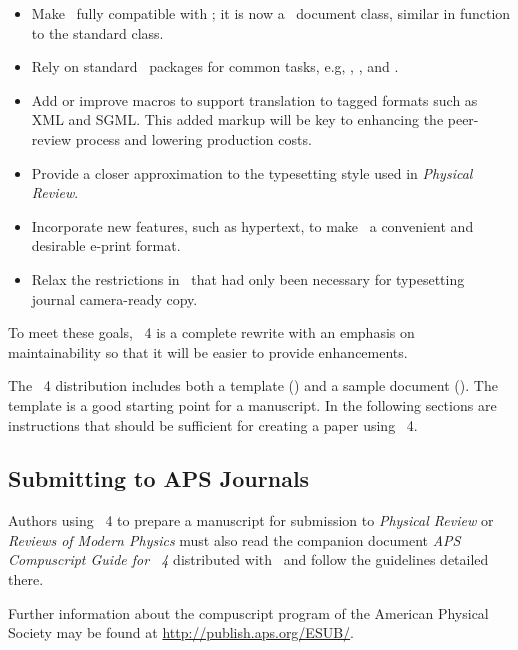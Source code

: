 \documentclass[%
 ,twocolumn%
 ,secnumarabic%
,amssymb, amsmath,nobibnotes, aps, prl]{revtex4}
\begin{document}
\begin{itemize}
\item
Make \revtex\ fully compatible with \LaTeXe; it is now a \LaTeXe\
document class, similar in function to the standard
 class.

\item
Rely on standard \LaTeXe\ packages for common tasks, e.g,
,
, and
.

\item
Add or improve macros to support translation to tagged formats such as
XML and SGML. This added markup will be key to enhancing the
peer-review process and lowering production costs.

\item
Provide a closer approximation to the typesetting style used in
\emph{Physical Review}.

\item
Incorporate new features, such as hypertext, to make \revtex\ a
convenient and desirable e-print format.

\item
Relax the restrictions in \revtex\ that had only been necessary for
typesetting journal camera-ready copy.
\end{itemize}

To meet these goals, \revtex~4 is a complete rewrite with an emphasis
on maintainability so that it will be easier to provide enhancements.

The \revtex~4 distribution includes both a template
() and a sample document ().
The template is a good starting point for a manuscript. In the
following sections are instructions that should be sufficient for
creating a paper using \revtex~4.

\subsection{Submitting to APS Journals}

Authors using \revtex~4 to prepare a manuscript for submission to
\textit{Physical Review} or \textit{Reviews of Modern Physics} 
must also read the companion document \textit{APS Compuscript Guide
for \revtex~4}
distributed with \revtex\ and follow the guidelines detailed there.

Further information about the compuscript program of the American
Physical Society may be found at \url{http://publish.aps.org/ESUB/}.
\end{document}
